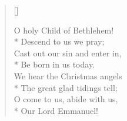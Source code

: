 \begin{verse}[\versewidth]
\begin{altverse}
O holy Child of Bethlehem!\\*
Descend to us we pray;\\
Cast out our sin and enter in,\\*
Be born in us today.\\
%
We hear the Christmas angels\\*
The great glad tidings tell;\\
O come to us, abide with us,\\*
Our Lord Emmanuel!
\end{altverse}

\end{verse}





